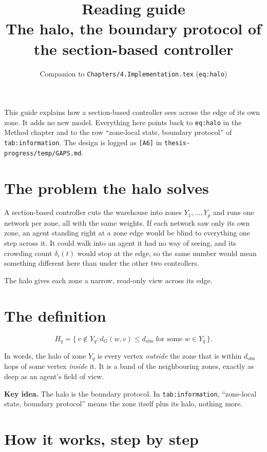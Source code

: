\documentclass[11pt,a4paper]{article}
\title{Reading guide\\[2pt]\large The halo, the boundary protocol of the section-based controller}
\author{Companion to \texttt{Chapters/4.Implementation.tex} (\texttt{eq:halo})}
\date{}
\newcommand{\idea}[1]{\par\smallskip\noindent\colorbox{boxbg}{\parbox{\dimexpr\linewidth-2\fboxsep}{\textbf{Key idea.} #1}}\par\smallskip}
\begin{document}
\maketitle

\noindent This guide explains how a section-based controller sees across
the edge of its own zone. It adds no new model. Everything here points back
to \texttt{eq:halo} in the Method chapter and to the row ``zone-local state,
boundary protocol'' of \texttt{tab:information}. The design is logged as
\texttt{[A6]} in \texttt{thesis-progress/temp/GAPS.md}.

\tableofcontents

\section{The problem the halo solves}

A section-based controller cuts the warehouse into zones $Y_1,\dots,Y_p$
and runs one network per zone, all with the same weights. If each network
saw only its own zone, an agent standing right at a zone edge would be
blind to everything one step across it. It could walk into an agent it had
no way of seeing, and its crowding count $\delta_i(t)$ would stop at the
edge, so the same number would mean something different here than under
the other two controllers.

The halo gives each zone a narrow, read-only view across its edge.

\section{The definition}

\[
  H_q = \{\, v \notin Y_q : d_G(w,v) \le d_{\mathrm{obs}} \text{ for some } w \in Y_q \,\}.
\]

\noindent In words, the halo of zone $Y_q$ is every vertex \emph{outside}
the zone that is within $d_{\mathrm{obs}}$ hops of some vertex
\emph{inside} it. It is a band of the neighbouring zones, exactly as deep as
an agent's field of view.

\idea{The halo is the boundary protocol. In \texttt{tab:information},
``zone-local state, boundary protocol'' means the zone itself plus its halo,
nothing more.}

\section{How it works, step by step}
\end{document}
